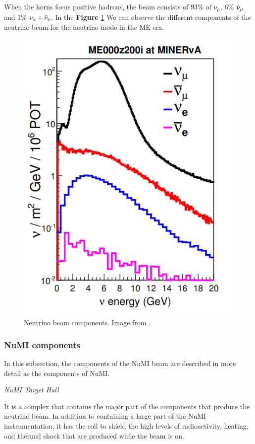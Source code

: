 When the horns focus positive hadrons, the beam consists of 93\% of $\nu_\mu$, 6\% $\Bar{\nu}_\mu$ and 1\% $\nu_e + \Bar{\nu}_e$. In the \textbf{Figure} \ref{fig:MnvExp:NuMI:NuMIBeamComponents} We can observe the different components of the neutrino beam for the neutrino mode in the ME era. 
\begin{figure}[!htb]
\centering
\includegraphics[scale=0.4]{Figures/Chapter2/NuMIbeamComponents.png}
        \caption{Neutrino beam components. Image from \cite{LeoThesis}.} 
\label{fig:MnvExp:NuMI:NuMIBeamComponents}
\end{figure}


\subsubsection{NuMI components}
In this subsection, the components of the NuMI beam are described in more detail as the components of NuMI.

\textit{NuMI Target Hall}

It is a complex that contains the major part of the components that produce the neutrino beam. In addition to containing a large part of the NuMI instrumentation, it has the roll to shield the high levels of radioactivity, heating, and thermal shock that are produced while the beam is on.  

